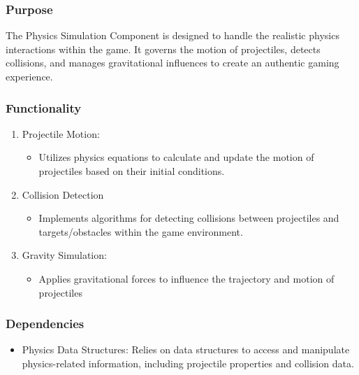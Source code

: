 \documentclass[12pt, titlepage]{article}
\begin{document}
\subsubsection{Purpose}
The Physics Simulation Component is designed to handle the realistic physics interactions within the game. It governs the motion of projectiles, detects collisions, and manages gravitational influences to create an authentic gaming experience.

\subsubsection{Functionality}
\begin{enumerate}
    \item Projectile Motion:
    \begin{itemize}
        \item Utilizes physics equations to calculate and update the motion of projectiles based on their initial conditions.
    \end{itemize}
\item Collision Detection
    \begin{itemize}
        \item Implements algorithms for detecting collisions between projectiles and targets/obstacles within the game environment.
    \end{itemize}
 \item Gravity Simulation:
    \begin{itemize}
        \item Applies gravitational forces to influence the trajectory and motion of projectiles
    \end{itemize}
\end{enumerate}

\subsubsection{Dependencies}
    \begin{itemize}
        \item Physics Data Structures: Relies on data structures to access and manipulate physics-related information, including projectile properties and collision data.
    \end{itemize}
\end{document}
